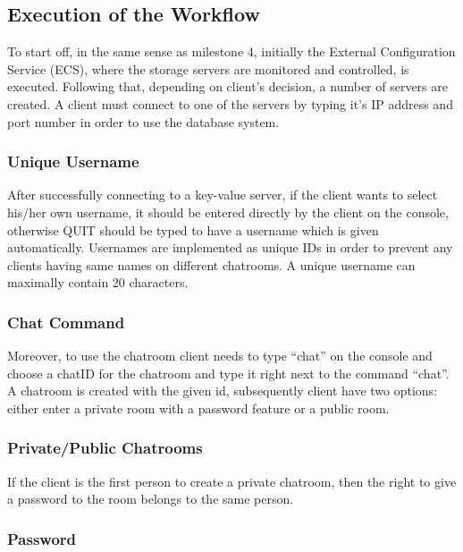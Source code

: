 \subsection{Execution of the Workflow}
\label{sec:groupchat_executionoftheworkflow}

To start off, in the same sense as milestone 4, initially the External Configuration Service (ECS), where the storage servers are monitored and controlled, is executed. Following that, depending on client's decision, a number of servers are created. A client must connect to one of the servers by typing it's IP address and port number in order to use the database system.

\subsubsection{Unique Username}
\label{sec:groupchat_executionoftheworkflow_uniqueusername}

After successfully connecting to a key-value server, if the client wants to select his/her own username, it should be entered directly by the client on the console, otherwise QUIT should be typed to have a username which is given automatically. Usernames are implemented as unique IDs in order to prevent any clients having same names on different chatrooms. A unique username can maximally contain 20 characters.
\subsubsection{Chat Command}
\label{sec:groupchat_executionoftheworkflow_chatcommand}

Moreover, to use the chatroom client needs to type “chat” on the console and choose a chatID for the chatroom and type it right next to the command “chat”. A chatroom is created with the given id, subsequently client have two options: either enter a private room with a password feature or a public room. 
\subsubsection{Private/Public Chatrooms}
\label{sec:groupchat_executionoftheworkflow_chatrooms}

If the client is the first person to create a private chatroom, then the right to give a password to the room belongs to the same person.
\subsubsection{Password}
\label{sec:groupchat_executionoftheworkflow_chatrooms_password}

